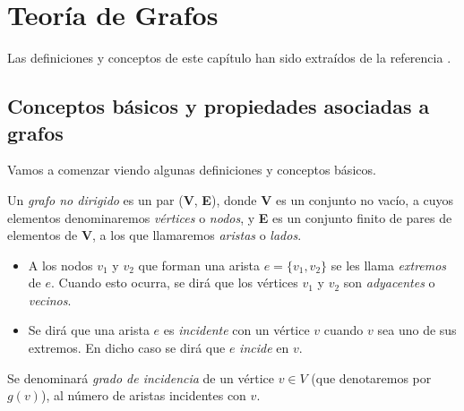 
\chapter{Teoría de Grafos}\label{ch:segundo-capitulo}
Las definiciones y conceptos de este capítulo han sido extraídos de la referencia \cite{algorithms}.

\section{Conceptos básicos y propiedades asociadas a grafos}
Vamos a comenzar viendo algunas definiciones y conceptos básicos.

\begin{definicion}
	Un \textit{grafo no  dirigido} es un par (\textbf{V}, \textbf{E}), donde \textbf{V} es un conjunto no vacío, a cuyos elementos denominaremos \textit{vértices} o \textit{nodos}, y \textbf{E} es un conjunto finito de pares de elementos de \textbf{V}, a los que llamaremos \textit{aristas} o \textit{lados}.
\end{definicion}

\begin{itemize}
	\item A los nodos $v_1$ y $v_2$ que forman una arista $e=\{v_1, v_2\}$ se les llama \textit{extremos} de $e$. Cuando esto ocurra, se dirá que los vértices $v_1$ y $v_2$ son \textit{adyacentes} o \textit{vecinos}.
	
	\item Se dirá que una arista $e$ es \textit{incidente} con un vértice $v$ cuando $v$ sea uno de sus extremos. En dicho caso se dirá que $e$ \textit{incide} en $v$.
\end{itemize}

\begin{definicion}
	Se denominará \textit{grado de incidencia} de un vértice $v\in V$ (que denotaremos por $g(v)$), al número de aristas incidentes con $v$.
\end{definicion}

